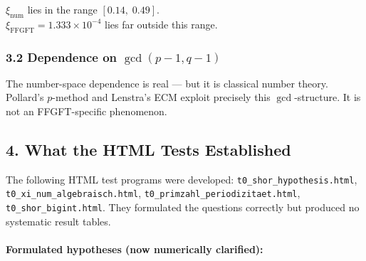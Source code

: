 \begin{mdframed}[style=warn]
$\xi_\text{num}$ lies in the range $[0.14,\; 0.49]$. \\
$\xi_\text{FFGFT} = 1.333 \times 10^{-4}$ lies far outside this range.
\end{mdframed}

\subsubsection*{3.2 Dependence on $\gcd(p-1, q-1)$}

\begin{center}
\end{center}

The number-space dependence is real — but it is classical number theory.
Pollard's $p$-method and Lenstra's ECM exploit precisely this $\gcd$-structure.
It is not an FFGFT-specific phenomenon.

\subsection*{4. What the HTML Tests Established}

The following HTML test programs were developed:
\texttt{t0\_shor\_hypothesis.html}, \texttt{t0\_xi\_num\_algebraisch.html},
\texttt{t0\_primzahl\_periodizitaet.html}, \texttt{t0\_shor\_bigint.html}.
They formulated the questions correctly but produced no systematic result tables.

\paragraph{Formulated hypotheses (now numerically clarified):}

